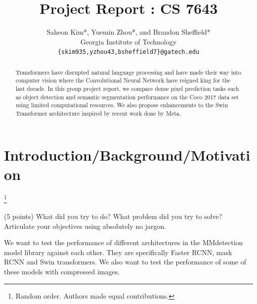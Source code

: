 \documentclass[10pt,twocolumn,letterpaper]{article}
\begin{document}
\title{Project Report : CS 7643}

\author{Saheon Kim*, Yuemin Zhou*, and Brandon Sheffield*\\
Georgia Institute of Technology\\
{\tt\small \{skim935,yzhou43,bsheffield7\}@gatech.edu}
}

\maketitle

\begin{abstract}


   Transformers have disrupted natural language processing and have made their way into computer vision where the Convolutional Neural Network have reigned king for the last decade. In this group project report, we compare dense pixel prediction tasks such as object detection and semantic segmentation performance on the Coco 2017 data set using limited computational resources. We also propose enhancements to the Swin Transformer architecture inspired by recent work done by Meta.

\end{abstract}

\section{Introduction/Background/Motivation}

\footnote{Random order. Authors made equal contributions.}

(5 points) What did you try to do? What problem did you try to solve? Articulate your objectives using absolutely no jargon.


We want to test the performance of different architectures in the MMdetection model library against each other. They are specifically Faster RCNN, mask RCNN and Swin transformers. We also want to test the performance of some of these models with compressed images. 
\end{document}
